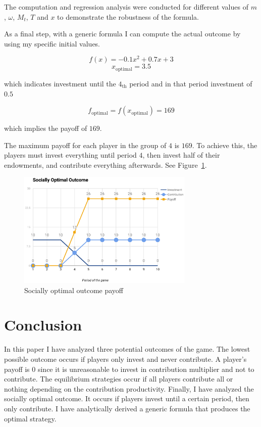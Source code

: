 			The computation and regression analysis were conducted for different values of $m$, $\omega$, $M_t$, $T$ and $x$ to demonstrate the robustness of the formula.
			
			As a final step, with a generic formula I can compute the actual outcome by using my specific initial values.
			
			\[
				f(x) = -0.1 x^2 + 0.7 x + 3
			\]
			\[
				x_{\text{optimal}} = 3.5
			\]
			
			which indicates investment until the $4_\text{th}$ period and in that period investment of $0.5$
			
			\[
				f_{\text{optimal}} = f(x_{\text{optimal}}) = 169
			\]
			
			which implies the payoff of $169$.
			
			The maximum payoff for each player in the group of $4$ is $169$.
			To achieve this, the players must invest everything until period $4$,
			then invest half of their endowments, and contribute everything afterwards. See Figure~\ref{fig:social}.

			\begin{figure}
				\begin{center}
					\includegraphics[width=8.4cm]{resources/eps/social.eps}
					\caption{Socially optimal outcome payoff} 
					\label{fig:social}
				\end{center}
			\end{figure}

\section{Conclusion}

	In this paper I have analyzed three potential outcomes of the game. The lowest possible outcome occurs if players only invest and never contribute. A player's payoff is $0$ since it is unreasonable to invest in contribution multiplier and not to contribute. The equilibrium strategies occur if all players contribute all or nothing depending on the contribution productivity. Finally, I have analyzed the socially optimal outcome. It occurs if players invest until a certain period, then only contribute. I have analytically derived a generic formula that produces the optimal strategy.

